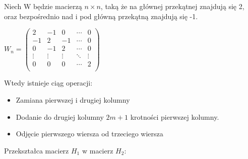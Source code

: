  Niech W będzie macierzą $n \times n$, taką że na głównej przekątnej znajdują się 2, oraz bezpośrednio nad i pod główną przekątną znajdują się -1. \\
 \begin{center}
 

 $
 W_{n}=\begin{pmatrix}
2 & -1 & 0 & \cdots & 0 \\
-1& 2 & -1 & \cdots & 0 \\
0 &-1 &  2 & \cdots & 0 \\
\vdots & \vdots & \vdots & \ddots & \vdots \\
0 & 0 & 0 &\cdots & 2 \\
 \end{pmatrix}
 $ \\
  \end{center}
 Wtedy istnieje ciąg operacji:
\begin{itemize}
\item Zamiana pierwszej i drugiej kolumny
\item Dodanie do drugiej kolumny $2m+1$ krotności pierwszej kolumny.
\item Odjęcie pierwszego wiersza od trzeciego wiersza
\end{itemize}
Przekształca macierz $H_{1}$ w macierz $H_{2}$:

